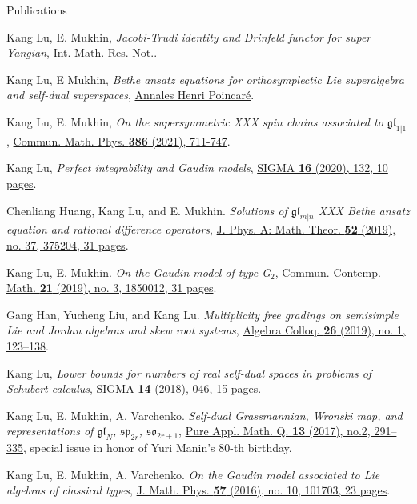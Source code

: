 \documentclass{resume} %
\begin{document}
\begin{rSection}{Publications}
\begin{etaremune}[leftmargin=0cm]
\item Kang Lu, E. Mukhin, {\it Jacobi-Trudi identity and Drinfeld functor for super Yangian}, \href{https://dx.doi.org/10.1093/imrn/rnab023}{Int. Math. Res. Not.}.

\item Kang Lu, E Mukhin, {\it Bethe ansatz equations for orthosymplectic Lie superalgebra and self-dual superspaces}, \href{https://doi.org/10.1007/s00023-021-01091-8}{Annales Henri Poincar\'{e}}.

\item Kang Lu, E. Mukhin, {\it On the supersymmetric XXX spin chains associated to $\mathfrak{gl}_{1|1}$}, \href{https://dx.doi.org/10.1007/s00220-021-04155-2}{Commun. Math. Phys. \textbf{386} (2021), 711-747}.

\item Kang Lu, {\it Perfect integrability and Gaudin models}, \href{https://doi.org/10.3842/SIGMA.2020.132}{SIGMA {\bf 16} (2020), 132, 10 pages}.

\item Chenliang Huang, Kang Lu, and E. Mukhin.
{\it Solutions of $\mathfrak{gl}_{m|n}$ XXX Bethe ansatz equation and rational difference operators}, \href{https://doi.org/10.1088/1751-8121/ab1960}{J. Phys. A: Math. Theor. \textbf{52} (2019), no. 37, 375204, 31 pages}.	
			
\item Kang Lu, E. Mukhin. 
{\it On the Gaudin model of type G$_2$}, \href{https://doi.org/10.1142/S0219199718500128}{Commun. Contemp. Math. \textbf{21} (2019), no. 3, 1850012, 31 pages}.

\item Gang Han, Yucheng Liu, and Kang Lu. {\it Multiplicity free gradings on semisimple Lie and Jordan algebras and skew root systems}, \href{https://doi.org/10.1142/S1005386719000129}{Algebra Colloq. {\bf 26} (2019), no. 1, 123--138}.
			
\item Kang Lu, {\it Lower bounds for numbers of real self-dual spaces in problems of Schubert calculus}, \href{https://doi.org/10.3842/SIGMA.2018.046}{SIGMA {\bf 14} (2018), 046, 15 pages}.	
			
\item Kang Lu, E. Mukhin, A. Varchenko. 
{\it Self-dual Grassmannian, Wronski map, and representations of $\mathfrak{gl}_N$, $\mathfrak{sp}_{2r}$, $\mathfrak{so}_{2r+1}$}, \href{http://dx.doi.org/10.4310/PAMQ.2017.v13.n2.a4}{Pure Appl. Math. Q. {\bf 13} (2017), no.2, 291--335}, special issue in honor of Yuri Manin's 80-th birthday.
					
\item Kang Lu, E. Mukhin, A. Varchenko. 
{\it On the Gaudin model associated to Lie algebras of classical types}, \href{https://doi.org/10.1063/1.4964389}{J. Math. Phys. {\bf 57} (2016), no. 10, 101703, 23 pages}.
\end{etaremune}
\end{rSection}
\end{document}
